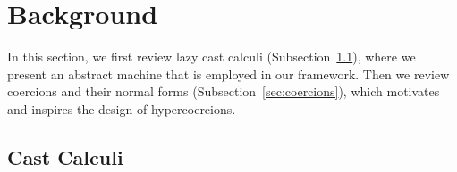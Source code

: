\documentclass[runningheads]{llncs}
\begin{document}


\section{Background} \label{sec:background}

In this section, we first review lazy cast calculi (Subsection~\ref{sec:cast-calculi}), where
we present an abstract machine that is employed in our framework. Then
we review coercions and their normal forms (Subsection~\ref{sec:coercions}), which
motivates and inspires the design of hypercoercions.

\subsection{Cast Calculi} \label{sec:cast-calculi}
\end{document}
